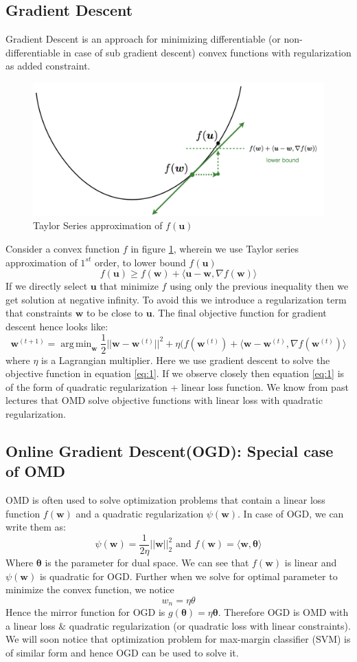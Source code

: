 \documentclass[11pt]{article}
\DeclareMathOperator*{\argmin}{arg\,min}
\begin{document}
\subsection{Gradient Descent}
Gradient Descent is an approach for minimizing differentiable (or non-differentiable in case of sub gradient descent) convex functions with regularization as added constraint. \begin{figure}[!b]
    \centering
    \includegraphics[width=0.5\linewidth]{images/GD_Taylor_Approx.png}
    \caption{Taylor Series approximation of $f(\mathbf{u})$}
    \label{fig:1}
\end{figure}
Consider a convex function $f$ in figure \ref{fig:1}, wherein we use Taylor series approximation of $1^{st}$ order, to lower bound $f(\mathbf{u})$
\[
f(\mathbf{u}) \geq f(\mathbf{w}) + \langle\mathbf{u}-\mathbf{w},\nabla f(\mathbf{w})\rangle
\]
If we directly select $\mathbf{u}$ that minimize $f$ using only the previous inequality then we get solution at negative infinity. To avoid this we introduce a regularization term that constraints $\mathbf{w}$ to be close to $\mathbf{u}$. The final objective function for gradient descent hence looks like:
\begin{equation}
    \label{eq:1}
    \mathbf{w}^{(t+1)} = \argmin_{\mathbf{w}} \frac{1}{2} ||\mathbf{w} - \mathbf{w}^{(t)}||^2 + \eta (f(\mathbf{w}^{(t)}) + \langle\mathbf{w}-\mathbf{w}^{(t)},\nabla f(\mathbf{w}^{(t)})\rangle
\end{equation}
where $\eta$ is a Lagrangian multiplier. Here we use gradient descent to solve the objective function in equation \ref{eq:1}. If we observe closely then equation \ref{eq:1} is of the form of quadratic regularization + linear loss function. We know from past lectures that OMD solve objective functions with linear loss with quadratic regularization.
\subsection{Online Gradient Descent(OGD): Special case of OMD}
OMD is often used to solve optimization problems that contain a linear loss function $f(\mathbf{w})$ and a quadratic regularization $\psi(\mathbf{w})$. In case of OGD, we can write them as:
\[ \psi(\mathbf{w}) = \frac{1}{2\eta} ||\mathbf{w}||_2^2 \text{  and  } f(\mathbf{w}) = \langle \mathbf{w},\pmb{\theta} \rangle
\]
Where $\pmb{\theta}$ is the parameter for dual space. We can see that $f(\mathbf{w})$ is linear and $\psi(\mathbf{w})$ is quadratic for OGD. Further when we solve for optimal parameter to minimize the convex function, we notice
\[
w_n = \eta \theta
\]
Hence the mirror function for OGD is $g(\pmb{\theta}) = \eta \pmb{\theta}$. Therefore OGD is OMD with a linear loss $\&$ quadratic regularization (or quadratic loss with linear constraints). We will soon notice that optimization problem for max-margin classifier (SVM) is of similar form and hence OGD can be used to solve it.
\end{document}
